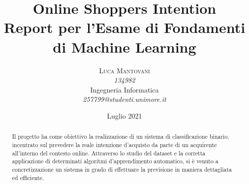 \documentclass[10pt,a4paper]{article}
\begin{document}
\title{Online Shoppers Intention \\
\Large{Report per l'Esame di Fondamenti di Machine Learning}
} %

\author{\textsc{Luca Mantovani} \\
    \emph{134982} \\
    Ingegneria Informatica\\
    \emph{257799@studenti.unimore.it}
  }
\date{Luglio 2021}
\maketitle
\clearpage

\tableofcontents{}
\clearpage

\begin{abstract}
\normalsize
    Il progetto ha come obiettivo la realizzazione di un sistema di classificazione binario, incentrato sul prevedere la reale intenzione d'acquisto da parte di un acquirente all'interno del contesto online. \hfill \break
    Attraverso lo studio del dataset e la  corretta applicazione di determinati algoritmi d'apprendimento automatico, si è venuto a concretizzazione un sistema in grado di effettuare la previsione in maniera dettagliata ed efficiente.
\end{abstract}

\clearpage
\end{document}
